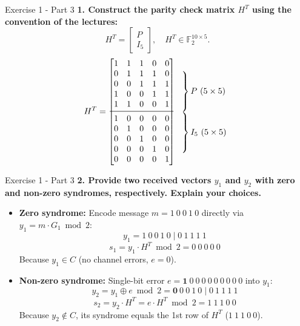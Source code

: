 \documentclass[10pt, aspectratio=169]{beamer}
\newcommand{\question}[1]{{\color{QuestionRed}\textbf{#1}}}
\begin{document}
\begin{frame}{Exercise 1 - Part 3}
  \question{1. Construct the parity check matrix $H^T$ using the convention of the lectures:}
  \[
    H^T = \begin{bmatrix} P \\ I_5 \end{bmatrix}, \quad H^T \in \mathbb{F}_2^{10 \times 5}.
  \]
  {\small
  \renewcommand{\arraystretch}{0.9}
  \[
    H^T = \begin{bmatrix}
      1 & 1 & 1 & 0 & 0 \\
      0 & 1 & 1 & 1 & 0 \\
      0 & 0 & 1 & 1 & 1 \\
      1 & 0 & 0 & 1 & 1 \\
      1 & 1 & 0 & 0 & 1 \\
      \midrule
      1 & 0 & 0 & 0 & 0 \\
      0 & 1 & 0 & 0 & 0 \\
      0 & 0 & 1 & 0 & 0 \\
      0 & 0 & 0 & 1 & 0 \\
      0 & 0 & 0 & 0 & 1
    \end{bmatrix}
    \begin{array}{l}
      \left.\rule{0pt}{0.95cm}\right\} P \ (5 \times 5) \\[0.15cm]
      \left.\rule{0pt}{0.95cm}\right\} I_5 \ (5 \times 5)
    \end{array}
  \]
  }
\end{frame}

\begin{frame}{Exercise 1 - Part 3}
  \question{2. Provide two received vectors $y_1$ and $y_2$ with zero and non-zero syndromes, respectively. Explain your choices.}

  \vspace{0.2cm}
  \begin{itemize}
    \item \textbf{Zero syndrome:}
    Encode message $m = 1\ 0\ 0\ 1\ 0$ directly via $y_1 = m \cdot G_1 \bmod 2$:
    \[
      y_1 = 1\ 0\ 0\ 1\ 0 \mid 0\ 1\ 1\ 1\ 1
    \]
    \[
      s_1 = y_1 \cdot H^T \bmod 2 = 0\ 0\ 0\ 0\ 0
    \]
    Because $y_1 \in C$ (no channel errors, $e = 0$).
    \item \textbf{Non-zero syndrome:}
    Single-bit error $e = \mathbf{1}\ 0\ 0\ 0\ 0\ 0\ 0\ 0\ 0\ 0$ into $y_1$:
    \[
      y_2 = y_1 \oplus e \bmod 2 = \mathbf{0}\ 0\ 0\ 1\ 0 \mid 0\ 1\ 1\ 1\ 1
    \]
    \[
      s_2 = y_2 \cdot H^T = e \cdot H^T \bmod 2 = 1\ 1\ 1\ 0\ 0
    \]
    Because $y_2 \notin C$, its syndrome equals the 1st row of $H^T$ ($1\ 1\ 1\ 0\ 0$).
  \end{itemize}
\end{frame}
\end{document}
